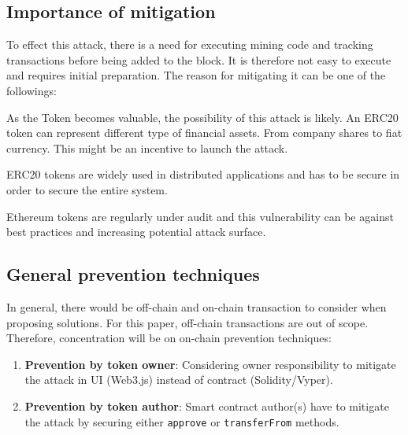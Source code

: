 \subsection{Importance of mitigation}
To effect this attack, there is a need for executing mining code and tracking transactions before being added to the block. It is therefore not easy to execute and requires initial preparation. The reason for mitigating it can be one of the followings:
\begin{compactlist}
	\item As the Token becomes valuable, the possibility of this attack is likely. An ERC20 token can represent different type of financial assets. From company shares to fiat currency. This might be an incentive to launch the attack.
	\item ERC20 tokens are widely used in distributed applications and has to be secure in order to secure the entire system.
	\item Ethereum tokens are regularly under audit and this vulnerability can be against best practices and increasing potential attack surface.
\end{compactlist}

\subsection{General prevention techniques}

\noindent In general, there would be off-chain and on-chain transaction to consider when proposing solutions. For this paper, off-chain transactions are out of scope. Therefore, concentration will be on on-chain prevention techniques:
\begin{enumerate}
	\item \textbf{Prevention by token owner}: Considering owner responsibility to mitigate the attack in UI (\eg Web3.js) instead of contract (\ie Solidity/Vyper).
	\item \textbf{Prevention by token author}: Smart contract author(s) have to mitigate the attack by securing either \texttt{approve} or \texttt{transferFrom} methods.
\end{enumerate}


